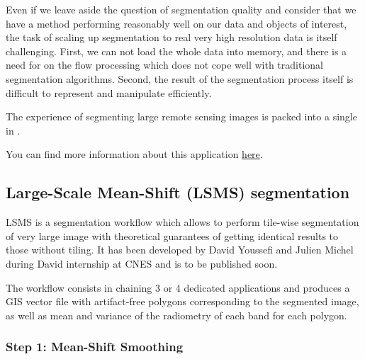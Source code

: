 Even if we leave aside the question of segmentation quality and
consider that we have a method performing reasonably well on our data
and objects of interest, the task of scaling up segmentation to real
very high resolution data is itself challenging. First, we can not
load the whole data into memory, and there is a need for on the flow
processing which does not cope well with traditional segmentation
algorithms. Second, the result of the segmentation process
itself is difficult to represent and manipulate efficiently.

The experience of segmenting large remote sensing images is packed into a single
 in \app.

You can find more information about this application
\href{http://blog.orfeo-toolbox.org/preview/coming-next-large-scale-segmentation}{here}.





\subsection{Large-Scale Mean-Shift (LSMS) segmentation}

LSMS is a segmentation workflow which allows to perform tile-wise
segmentation of very large image with theoretical guarantees of
getting identical results to those without tiling. It has been
developed by David Youssefi and Julien Michel during David internship
at CNES and is to be published soon.

The workflow consists in chaining 3 or 4 dedicated applications and
produces a GIS vector file with artifact-free polygons corresponding
to the segmented image, as well as mean and variance of the radiometry
of each band for each polygon.

\subsubsection{Step 1: Mean-Shift Smoothing}

